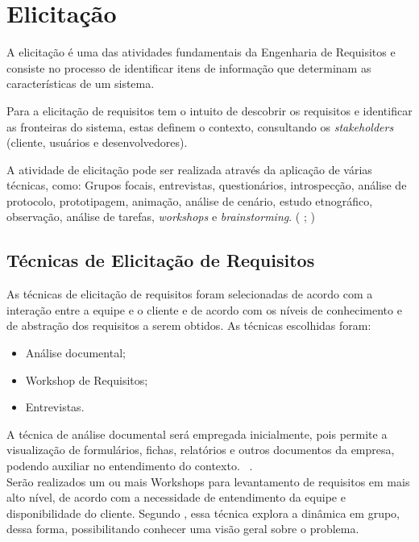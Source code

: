 \chapter[Elicitação]{Elicitação}
A elicitação é uma das atividades fundamentais da Engenharia de Requisitos e consiste no processo de identificar
itens de informação que determinam as características de um sistema. \cite{jitnah} 

Para  a elicitação de requisitos tem o intuito de descobrir
os requisitos e identificar as fronteiras do sistema, estas definem o contexto, consultando os \textit{stakeholders} (cliente, usuários e desenvolvedores).

A atividade de elicitação pode ser realizada através da aplicação de várias técnicas, como: Grupos focais, entrevistas, questionários,
introspecção, análise de protocolo, prototipagem, animação, análise de cenário, estudo etnográfico, observação, análise de tarefas,
\textit{workshops} e \textit{brainstorming}. (\cite{jitnah} ; \cite{coulin})

\section{Técnicas de Elicitação de Requisitos}
\label{tecnicas}

As técnicas de elicitação de requisitos foram selecionadas de acordo com a interação entre a equipe e o cliente e de acordo com os níveis de conhecimento e de abstração dos requisitos a serem obtidos.
As técnicas escolhidas foram:\\
\begin{itemize}
\item Análise documental;
\item Workshop de Requisitos;
\item Entrevistas.
\end{itemize}

A técnica de análise documental será empregada inicialmente, pois permite a visualização de formulários, fichas, relatórios e outros documentos da empresa, podendo auxiliar no entendimento do contexto. ~\cite{falbo}.\\

Serão realizados um ou mais Workshops para levantamento de requisitos em mais alto nível, de acordo com a necessidade de entendimento da equipe e disponibilidade do cliente.
Segundo , essa técnica explora a dinâmica em grupo, dessa forma, possibilitando conhecer uma visão geral sobre o problema.\\

